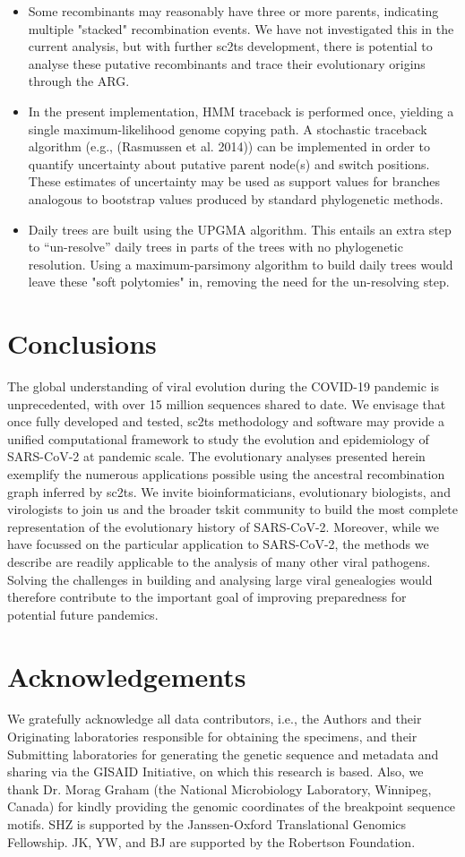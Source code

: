 \documentclass{article}
\begin{document}
\begin{itemize}
\item Some recombinants may reasonably have three or more parents, indicating multiple "stacked" recombination events. We have not investigated this in the current analysis, but with further sc2ts development, there is potential to analyse these putative recombinants and trace their evolutionary origins through the ARG.
\item In the present implementation, HMM traceback is performed once, yielding a single maximum-likelihood genome copying path. A stochastic traceback algorithm (e.g., (Rasmussen et al. 2014)) can be implemented in order to quantify uncertainty about putative parent node(s) and switch positions. These estimates of uncertainty may be used as support values for branches analogous to bootstrap values produced by standard phylogenetic methods.
\item Daily trees are built using the UPGMA algorithm. This entails an extra step to ``un-resolve'' daily trees in parts of the trees with no phylogenetic resolution. Using a maximum-parsimony algorithm to build daily trees would leave these "soft polytomies" in, removing the need for the un-resolving step.
\end{itemize}

\section{Conclusions}
The global understanding of viral evolution during the COVID-19 pandemic is unprecedented, with over 15 million sequences shared to date. We envisage that once fully developed and tested, sc2ts methodology and software may provide a unified computational framework to study the evolution and epidemiology of SARS-CoV-2 at pandemic scale. The evolutionary analyses presented herein exemplify the numerous applications possible using the ancestral recombination graph inferred by sc2ts. We invite bioinformaticians, evolutionary biologists, and virologists to join us and the broader tskit community to build the most complete representation of the evolutionary history of SARS-CoV-2. Moreover, while we have focussed on the particular application to SARS-CoV-2, the methods we describe are readily applicable to the analysis of many other viral pathogens. Solving the challenges in building and analysing large viral genealogies would therefore contribute to the important goal of improving preparedness for potential future pandemics.

\section{Acknowledgements}
We gratefully acknowledge all data contributors, i.e., the Authors and their
Originating laboratories responsible for obtaining the specimens, and their
Submitting laboratories for generating the genetic sequence and metadata and
sharing via the GISAID Initiative, on which this research is based. Also, we
thank Dr. Morag Graham (the National Microbiology Laboratory, Winnipeg, Canada)
for kindly providing the genomic coordinates of the breakpoint sequence motifs.
SHZ is supported by the Janssen-Oxford Translational Genomics Fellowship. JK,
YW, and BJ are supported by the Robertson Foundation.
\end{document}

